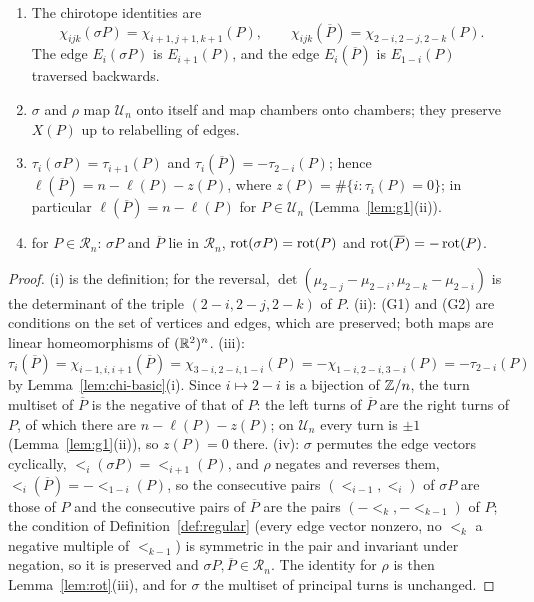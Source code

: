 \begin{lemma}\label{lem:shift}
\begin{enumerate}
\item[(i)] The chirotope identities are
\[
 \chi_{ijk}(\sigma P)=\chi_{i+1,j+1,k+1}(P),\qquad
 \chi_{ijk}(\overline P)=\chi_{2-i,2-j,2-k}(P).
\]
The edge $E_i(\sigma P)$ is $E_{i+1}(P)$, and the edge
$E_i(\overline P)$ is $E_{1-i}(P)$ traversed backwards.
\item[(ii)] $\sigma$ and $\rho$ map $\mathcal U_n$ onto itself and map chambers
onto chambers; they preserve $X(P)$ up to relabelling of edges.
\item[(iii)] $\tau_i(\sigma P)=\tau_{i+1}(P)$ and $\tau_i(\overline P)=-\tau_{2-i}(P)$;
hence $\ell(\overline P)=n-\ell(P)-z(P)$, where $z(P)=\#\{i:\tau_i(P)=0\}$;
in particular $\ell(\overline P)=n-\ell(P)$ for $P\in\mathcal U_n$
(Lemma~\ref{lem:g1}(ii)).
\item[(iv)] for $P\in\mathcal R_n$: $\sigma P$ and $\overline P$ lie in
$\mathcal R_n$, $\operatorname{rot}(\sigma P)=\operatorname{rot}(P)$ and $\operatorname{rot}(\overline P)=-\operatorname{rot}(P)$.
\end{enumerate}
\end{lemma}
\begin{proof}
(i) is the definition; for the reversal, $\det(\mu_{2-j}-\mu_{2-i},\mu_{2-k}-\mu_{2-i})$
is the determinant of the triple $(2-i,2-j,2-k)$ of $P$. (ii): (G1) and (G2) are
conditions on the set of vertices and edges, which are preserved; both maps are
linear homeomorphisms of $(\mathbb R^2)^n$. (iii): $\tau_i(\overline P)=
\chi_{i-1,i,i+1}(\overline P)=\chi_{3-i,2-i,1-i}(P)=-\chi_{1-i,2-i,3-i}(P)
=-\tau_{2-i}(P)$ by Lemma~\ref{lem:chi-basic}(i). Since $i\mapsto2-i$ is a
bijection of $\mathbb Z/n$, the turn multiset of $\overline P$ is the negative of
that of $P$: the left turns of $\overline P$ are the right turns of $P$, of
which there are $n-\ell(P)-z(P)$; on $\mathcal U_n$ every turn is $\pm1$
(Lemma~\ref{lem:g1}(ii)), so $z(P)=0$ there.
(iv): $\sigma$ permutes the edge vectors cyclically,
$\lt_i(\sigma P)=\lt_{i+1}(P)$, and $\rho$ negates and reverses them,
$\lt_i(\overline P)=-\lt_{1-i}(P)$, so the consecutive pairs
$(\lt_{i-1},\lt_i)$ of $\sigma P$ are those of $P$ and the consecutive pairs
of $\overline P$ are the pairs $(-\lt_k,-\lt_{k-1})$ of $P$; the condition of
Definition~\ref{def:regular} (every edge vector nonzero, no $\lt_k$ a negative
multiple of $\lt_{k-1}$) is symmetric in the pair and invariant under
negation, so it is preserved and $\sigma P,\overline P\in\mathcal R_n$. The
identity for $\rho$ is then Lemma~\ref{lem:rot}(iii), and for $\sigma$ the
multiset of principal turns is unchanged.
\end{proof}


